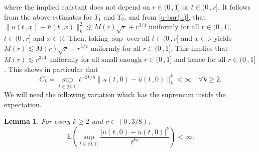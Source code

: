 \documentclass[reqno]{amsart}
\newcommand{\<}{\langle}
\renewcommand{\>}{\rangle}
\newcommand{\R}{\mathbb{R}}
\newcommand{\E}{\mathrm{E}}
\newcommand{\1}{\mathbb{1}}
\renewcommand{\ge}{\geqslant}
\newtheorem{lemma}[stat]{Lemma}
\theoremstyle{definition}
\numberwithin{equation}{section}
\begin{document}
where the implied constant does not depend on $r \in (0\,,1]$ or $t\in(0\,,r]$.
It follows from the above estimates for $T_1$ and $T_2$, and
from \eqref{u-bar(u)}, that $\|u(t\,,x)-\bar u(t\,,x)\|_k^2 \lesssim M(r) \sqrt{r} + r^{3/4}$ uniformly for all $r \in (0\,,1]$, $t \in (0\,,r]$ and $x \in \R$.
Then, taking $\sup$ over all $t \in (0\,,r]$ and $x \in \R$ yields
$M(r) \lesssim M(r) \sqrt{r} + r^{3/4}$ uniformly for all $r\in (0\,,1]$.
This implies that $M(r)\lesssim r^{3/4}$ uniformly for all small-enough
$r\in(0\,,1]$ and hence for all $r\in(0\,,1]$.
This shows in particular that
\begin{equation}\label{uu}
	C_k =\sup_{t\in(0,1]} t^{-3k/8}
	\|  u(t\,,0) - \bar{u}(t\,,0) \|_k^k <\infty
	\quad\forall k\ge2.
\end{equation}
We will need the following variation which has the supremum inside the expectation.

\begin{lemma}\label{lem:u-bar(u)}
	For every $k\ge 2$ and $\nu\in(0\,,3/8)$,
	\[
		\E\left( \sup_{t\in(0,1]}\frac{|u(t\,,0) - \bar{u}(t\,,0)|^k}{t^{k\nu}}\right)<\infty.
	\]
\end{lemma}
\end{document}
